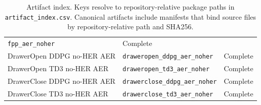 \begin{table}[t]
\begin{tabular}{>{\raggedright\arraybackslash}p{}
                >{\raggedright\arraybackslash}p{}
                >{\raggedright\arraybackslash}p{}}
\texttt{fpp\_aer\_noher} & Complete \\
DrawerOpen DDPG no-HER AER &
\texttt{draweropen\_ddpg\_aer\_noher} & Complete \\
DrawerOpen TD3 no-HER AER &
\texttt{draweropen\_td3\_aer\_noher} & Complete \\
DrawerClose DDPG no-HER AER &
\texttt{drawerclose\_ddpg\_aer\_noher} & Complete \\
DrawerClose TD3 no-HER AER &
\texttt{drawerclose\_td3\_aer\_noher} & Complete \\
\bottomrule
\end{tabular}
\caption{Artifact index. Keys resolve to repository-relative package paths in
\texttt{artifact\_index.csv}. Canonical artifacts include manifests that bind
source files by repository-relative path and SHA256.}
\label{tab:supp-artifact-index}
\end{table}
